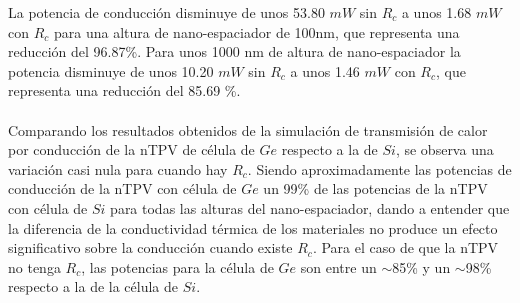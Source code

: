 La potencia de conducción disminuye de unos 53.80 $mW$ sin $R_c$ a unos 1.68 $mW$ con $R_c$ para una altura de nano-espaciador de 100nm, que representa una reducción del 96.87\%. Para unos 1000 nm de altura de nano-espaciador la potencia disminuye de unos 10.20 $mW$ sin $R_c$ a unos 1.46 $mW$ con $R_c$, que representa una reducción del 85.69 \%.\\\\
Comparando los resultados obtenidos de la simulación de transmisión de calor por conducción de la nTPV de célula de $Ge$ respecto a la de $Si$, se observa una variación casi nula para cuando hay $R_c$. Siendo aproximadamente las potencias de conducción de la nTPV con célula de $Ge$ un 99\% de las potencias de la nTPV con célula de $Si$ para todas las alturas del nano-espaciador, dando a entender que la diferencia de la conductividad térmica de los materiales no produce un efecto significativo sobre la conducción cuando existe $R_c$. Para el caso de que la nTPV no tenga $R_c$, las potencias para la célula de $Ge$ son entre un $\sim$85\% y un $\sim$98\% respecto a la de la célula de $Si$.
\vfill
